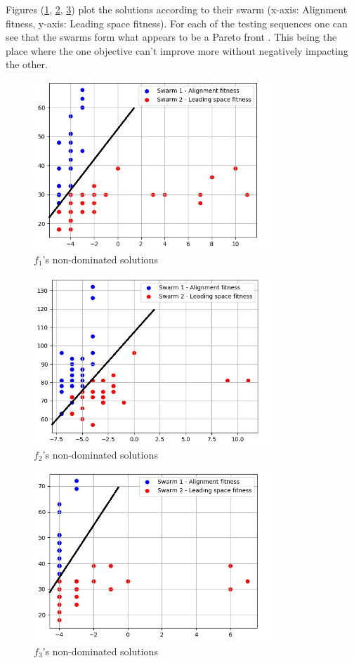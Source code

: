 \documentclass[conference]{IEEEtran}
\begin{document}
\newpage
Figures (\ref{fig:f1:solutions}, \ref{fig:f2:solutions}, \ref{fig:f3:solutions}) plot the solutions according to their swarm (x-axis: Alignment fitness, y-axis: Leading space fitness). For each of the testing sequences one can see that the swarms form what appears to be a Pareto front \cite{kian-lim:pso}. This being the place where the one objective can't improve more without negatively impacting the other. 

\begin{figure}[htbp]
\centerline{\includegraphics[width=90mm]{images/results/f1-solutions.png}}
\caption{$f_1$'s non-dominated solutions }
\label{fig:f1:solutions}
\end{figure}

\begin{figure}[htbp]
\centerline{\includegraphics[width=90mm]{images/results/f2-solutions.png}}
\caption{$f_2$'s non-dominated solutions }
\label{fig:f2:solutions}
\end{figure}

\begin{figure}[htbp]
\centerline{\includegraphics[width=90mm]{images/results/f3-solutions.png}}
\caption{$f_3$'s non-dominated solutions }
\label{fig:f3:solutions}
\end{figure}
\end{document}

